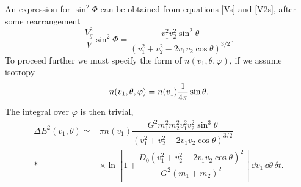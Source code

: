 An expression for $\sin^2\Phi$ can be obtained from equations \eqref{Vs} and \eqref{V2s}, after some rearrangement
\begin{equation}
\dfrac{V_g^2}{V}\sin^2\Phi = \dfrac{v_1^2v_2^2\sin^2\theta}{\left(v_1^2 + v_2^2 - 2v_1 v_2 \cos\theta\right)^{3/2}}.
\end{equation}
To proceed further we must specify the form of $n(v_1,\theta,\varphi)$, if we assume isotropy
\begin{equation}
n(v_1,\theta,\varphi) = n(v_1)\dfrac{1}{4\pi}\sin\theta.
\end{equation}
The integral over $\varphi$ is then trivial,
\begin{align}
\Delta E^2(v_1,\theta) \simeq {} & \pi n(v_1)\dfrac{G^2m_1^2 m_2^2v_1^2v_2^2\sin^3\theta}{\left(v_1^2 + v_2^2 - 2v_1 v_2 \cos\theta\right)^{3/2}} \nonumber \\*
 {} & \times \left. \ln\left[1 + \dfrac{D_0\left(v_1^2 + v_2^2 - 2v_1 v_2 \cos\theta\right)^2}{G^2\left(m_1 + m_2\right)^2}\right]\,\dd v_1\,\dd\theta\,\delta t.\right.
\end{align}

